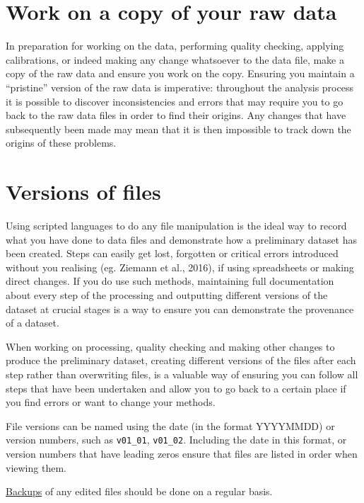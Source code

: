 \documentclass[12pt,a4paper,oneside]{report}
\begin{document}
\hypertarget{work-on-a-copy-of-your-raw-data}{%
\section{Work on a copy of your raw
data}\label{work-on-a-copy-of-your-raw-data}}

In preparation for working on the data, performing quality checking,
applying calibrations, or indeed making any change whatsoever to the
data file, make a copy of the raw data and ensure you work on the copy.
Ensuring you maintain a ``pristine'' version of the raw data is
imperative: throughout the analysis process it is possible to discover
inconsistencies and errors that may require you to go back to the raw
data files in order to find their origins. Any changes that have
subsequently been made may mean that it is then impossible to track down
the origins of these problems.

\hypertarget{versions-of-files}{%
\section{Versions of files}\label{versions-of-files}}

Using scripted languages to do any file manipulation is the ideal way to
record what you have done to data files and demonstrate how a
preliminary dataset has been created. Steps can easily get lost,
forgotten or critical errors introduced without you realising (eg.
Ziemann et al., 2016), if using spreadsheets or making direct changes.
If you do use such methods, maintaining full documentation about every
step of the processing and outputting different versions of the dataset
at crucial stages is a way to ensure you can demonstrate the provenance
of a dataset.

When working on processing, quality checking and making other changes to
produce the preliminary dataset, creating different versions of the
files after each step rather than overwriting files, is a valuable way
of ensuring you can follow all steps that have been undertaken and allow
you to go back to a certain place if you find errors or want to change
your methods.

File versions can be named using the date (in the format YYYYMMDD) or
version numbers, such as \texttt{v01\_01}, \texttt{v01\_02}. Including
the date in this format, or version numbers that have leading zeros
ensure that files are listed in order when viewing them.

\protect\hyperlink{backing-up-data}{Backups} of any edited files should
be done on a regular basis.
\end{document}
